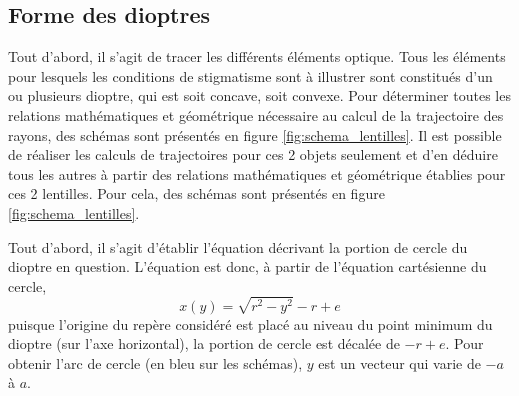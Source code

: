 \documentclass[a4paper,11pt]{article}
\begin{document}
\subsection{Forme des dioptres}
Tout d'abord, il s'agit de tracer les différents éléments optique. Tous les éléments pour lesquels les conditions de stigmatisme sont à illustrer sont constitués d'un ou plusieurs dioptre, qui est soit concave, soit convexe. Pour déterminer toutes les relations mathématiques et géométrique nécessaire au calcul de la trajectoire des rayons, des schémas sont présentés en figure \ref{fig:schema_lentilles}. Il est possible de réaliser les calculs de trajectoires pour ces 2 objets seulement et d'en déduire tous les autres à partir des relations mathématiques et géométrique établies pour ces 2 lentilles. Pour cela, des schémas sont présentés en figure \ref{fig:schema_lentilles}.

Tout d'abord, il s'agit d'établir l'équation décrivant la portion de cercle du dioptre en question. L'équation est donc, à partir de l'équation cartésienne du cercle,
\begin{equation}
	x(y) = \sqrt{r^2 - y^2} - r + e
\end{equation}
puisque l'origine du repère considéré est placé au niveau du point minimum du dioptre (sur l'axe horizontal), la portion de cercle est décalée de $-r+e$. Pour obtenir l'arc de cercle (en bleu sur les schémas), $y$ est un vecteur qui varie de $-a$ à $a$.
\end{document}
